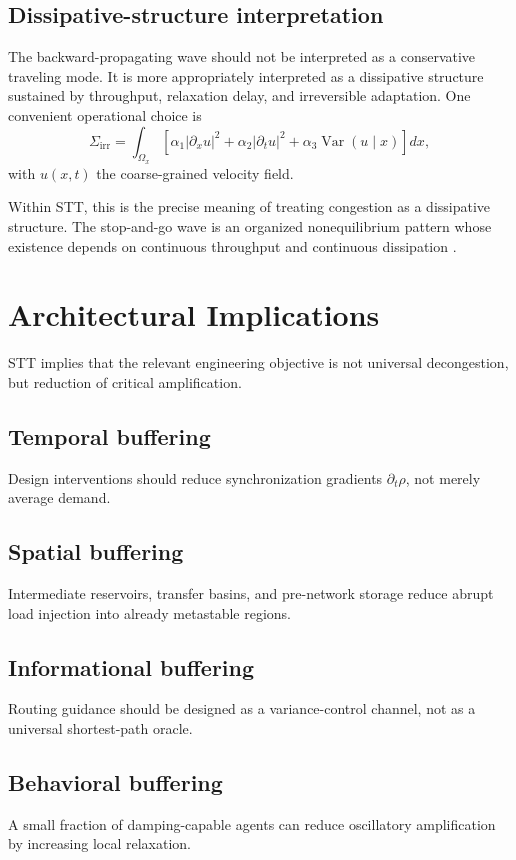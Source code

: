 \documentclass[11pt]{article}
\begin{document}
\subsection{Dissipative-structure interpretation}
The backward-propagating wave should not be interpreted as a conservative traveling mode. It is more appropriately interpreted as a dissipative structure sustained by throughput, relaxation delay, and irreversible adaptation. One convenient operational choice is
\begin{equation}
\Sigma_{\mathrm{irr}} = \int_{\Omega_x} \left[\alpha_1 |\partial_x u|^2 + \alpha_2 |\partial_t u|^2 + \alpha_3 \operatorname{Var}(u\mid x)\right]dx,
\end{equation}
with $u(x,t)$ the coarse-grained velocity field.

Within STT, this is the precise meaning of treating congestion as a dissipative structure. The stop-and-go wave is an organized nonequilibrium pattern whose existence depends on continuous throughput and continuous dissipation \cite{Helbing2001}.

\section{Architectural Implications}
STT implies that the relevant engineering objective is not universal decongestion, but reduction of critical amplification.

\subsection{Temporal buffering}
Design interventions should reduce synchronization gradients $\partial_t\rho$, not merely average demand.

\subsection{Spatial buffering}
Intermediate reservoirs, transfer basins, and pre-network storage reduce abrupt load injection into already metastable regions.

\subsection{Informational buffering}
Routing guidance should be designed as a variance-control channel, not as a universal shortest-path oracle.

\subsection{Behavioral buffering}
A small fraction of damping-capable agents can reduce oscillatory amplification by increasing local relaxation.
\end{document}
